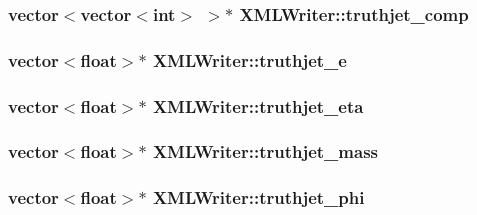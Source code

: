 \subsubsection[{\texorpdfstring{truthjet\+\_\+comp}{truthjet_comp}}]{\setlength{\rightskip}{0pt plus 5cm}vector$<$vector$<$int$>$ $>$$\ast$ X\+M\+L\+Writer\+::truthjet\+\_\+comp}\hypertarget{classXMLWriter_a5acd9fa2dadf536f05d82293bae9e0c9}{}\label{classXMLWriter_a5acd9fa2dadf536f05d82293bae9e0c9}
\subsubsection[{\texorpdfstring{truthjet\+\_\+e}{truthjet_e}}]{\setlength{\rightskip}{0pt plus 5cm}vector$<$float$>$$\ast$ X\+M\+L\+Writer\+::truthjet\+\_\+e}\hypertarget{classXMLWriter_a57d4e6cbec226a74027cec6a1cf3fb74}{}\label{classXMLWriter_a57d4e6cbec226a74027cec6a1cf3fb74}
\subsubsection[{\texorpdfstring{truthjet\+\_\+eta}{truthjet_eta}}]{\setlength{\rightskip}{0pt plus 5cm}vector$<$float$>$$\ast$ X\+M\+L\+Writer\+::truthjet\+\_\+eta}\hypertarget{classXMLWriter_a560f9f50b116173e75824910d6f8015f}{}\label{classXMLWriter_a560f9f50b116173e75824910d6f8015f}
\subsubsection[{\texorpdfstring{truthjet\+\_\+mass}{truthjet_mass}}]{\setlength{\rightskip}{0pt plus 5cm}vector$<$float$>$$\ast$ X\+M\+L\+Writer\+::truthjet\+\_\+mass}\hypertarget{classXMLWriter_a74acc20582f56341fefed138c1354381}{}\label{classXMLWriter_a74acc20582f56341fefed138c1354381}
\subsubsection[{\texorpdfstring{truthjet\+\_\+phi}{truthjet_phi}}]{\setlength{\rightskip}{0pt plus 5cm}vector$<$float$>$$\ast$ X\+M\+L\+Writer\+::truthjet\+\_\+phi}\hypertarget{classXMLWriter_a59119372356b52c70ed218b895babe29}{}\label{classXMLWriter_a59119372356b52c70ed218b895babe29}
